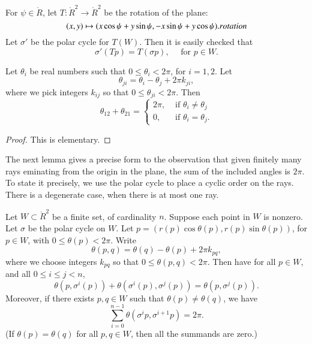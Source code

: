 For $\psi\in\ring{R}$, let $T:\ring{R}^2\to\ring{R}^2$ be the
rotation of the plane:
   \begin{equation}
   \label{eqn:rotate}
   (x,y) \mapsto  (x\cos\psi + y\sin\psi,-x\sin\psi+y\cos\psi).
   \index{Index}{rotation}
   \end{equation}
Let $\sigma'$ be the polar cycle for $T(W)$.  Then it is easily
checked that
$$
   \sigma'(T p) = T (\sigma p),\quad \text{ for } p\in W. 
$$

\begin{lemma}\label{lemma:polar2}
Let $\theta_i$ be real numbers such that $0\le \theta_i < 2\pi$, for $i=1,2$.
Let $$\theta_{ji} = \theta_i - \theta_j + 2\pi k_{ji},$$
where we pick integers $k_{ij}$ so that $0\le \theta_{ji}< 2\pi$.
Then 
$$
  \theta_{12} + \theta_{21} = \begin{cases}
    2\pi, & \text{ if }\theta_i\ne\theta_j\\
    0,    & \text{ if }\theta_i=\theta_j.
    \end{cases}
$$
\end{lemma}

\begin{proof} This is elementary.
\end{proof}

The next lemma gives a precise form to the observation
that given finitely many rays eminating from the origin
in the plane, the sum of the included angles is $2\pi$.
To state it precisely, we use the polar cycle to place
a cyclic order on the rays.  There is a degenerate case,
when there is at most one ray.


\begin{lemma}\label{lemma:polar-sum}
Let $W\subset\ring{R}^2$ be a finite set,
of cardinality $n$. Suppose each point in $W$ is nonzero.
Let $\sigma$ be the polar cycle on $W$.  
Let $p=(r(p)\cos\theta(p),r(p)\sin\theta(p))$, for $p\in W$, with
$0\le\theta(p)<2\pi$.
Write
   $$
   \theta(p,q) = \theta(q) - \theta(p) + 2\pi k_{pq},
   $$
where we choose integers $k_{pq}$ so that $0\le \theta(p,q) < 2\pi$.
Then have for all $p\in W$,
and all $0\le i \le j < n$,
   $$
   \theta(p,\sigma^i(p)) +\theta(\sigma^i(p),\sigma^j(p)) =
   \theta(p,\sigma^j(p)).
   $$
Moreover, if there exists $p,q\in W$ such that $\theta(p)\ne\theta(q)$,
we have 
  $$
  \sum_{i=0}^{n-1} \theta(\sigma^{i}p,\sigma^{i+1} p) = 2\pi.
  $$
(If $\theta(p)=\theta(q)$ for all $p,q\in W$, then all the
summands are zero.)
\end{lemma}

